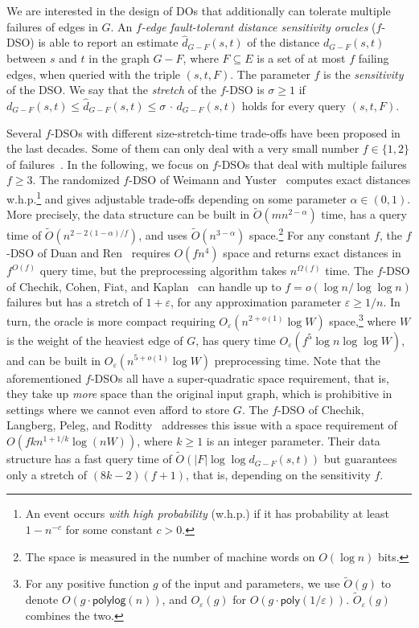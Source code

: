 \documentclass{theoretics}
\newcommand*{\Otilde}{\widetilde{O}}
\newcommand*{\poly}{\textsf{poly}}
\newcommand*{\polylog}{\textsf{polylog}}
\renewcommand{\leq}{\leqslant}
\renewcommand{\geq}{\geqslant}
\renewcommand{\ge}{\geqslant}
\newcommand{\eps}{\varepsilon}
\begin{document}
We are interested in the design of DOs that additionally can tolerate multiple failures of edges in $G$. 
An \emph{$f$-edge fault-tolerant distance sensitivity oracles} ($f$-DSO) is able to report an estimate $\widehat{d}_{G-F}(s,t)$ of the distance $d_{G-F}(s,t)$ between $s$ and $t$ in the graph $G-F$, where $F \subseteq E$ is a set of at most $f$ failing edges, when queried with the triple $(s,t,F)$. 
The parameter $f$ is the \emph{sensitivity} of the DSO.
We say that the \emph{stretch} of the $f$-DSO is $\sigma \geq 1$ if $d_{G-F}(s,t) \leq \widehat{d}_{G-F}(s,t) \leq \sigma \,{\cdot}\, d_{G-F}(s,t)$ holds for every query $(s,t,F)$. 

Several $f$-DSOs with different size-stretch-time trade-offs have been proposed in the last decades.
Some of them can only deal with a very small number $f \in \{1,2\}$ of failures~\cite{BaswanaK13, BeKa08, BeKa09, BCFS21SingleSourceDSO_ESA, ChCo20, DemetrescuT02, DeThChRa08, DuanP09a, GrandoniVWilliamsFasterRPandDSO_journal, GuRen21, Ren22Improved}. In the following, we focus on $f$-DSOs that deal with multiple failures $f \geq 3$. The randomized $f$-DSO of Weimann and Yuster~\cite{WY13} computes exact distances w.h.p.\footnote{%
  An event occurs \emph{with high probability} (w.h.p.) if it has probability at least $1- n^{-c}$ for some constant $c >0$.
}
and gives adjustable trade-offs depending on some parameter $\alpha \in (0,1)$.
More precisely, the data structure can be built in $\Otilde(mn^{2-\alpha})$ time, has a query time of 
$\Otilde(n^{2-2(1-\alpha)/f})$, and uses $\Otilde(n^{3-\alpha})$ space.\footnote{%
  The space is measured in the number of machine words on $O(\log n)$ bits.
} 
For any constant $f$, the $f$-DSO of Duan and Ren~\cite{DuRe22} requires $O(fn^4)$ space and
returns exact distances in $f^{O(f)}$ query time, but the preprocessing algorithm 
takes $n^{\Omega(f)}$ time. The $f$-DSO of Chechik, Cohen, Fiat, and Kaplan~\cite{ChCoFiKa17}
can handle up to $f = o(\log n / \log \log n)$ failures
but has a stretch of $1+\eps$, for any approximation parameter $\eps \ge 1/n$.
In turn, the oracle is more compact requiring $O_{\varepsilon}(n^{2+o(1)}\log W)$ space,\footnote{%
	For any positive function $g$ of the input and parameters, we use 
	$\Otilde(g)$ to denote $O(g \cdot \polylog(n))$,
	and $O_{\varepsilon}(g)$ for $O(g \cdot \poly(1/\varepsilon))$.
	$\Otilde_{\varepsilon}(g)$ combines the two.
}
where $W$ is the weight of the heaviest edge of $G$,
has query time $O_{\varepsilon}(f^5\log n \log \log W)$,
and can be built in $O_{\varepsilon}(n^{5+o(1)}\log W)$ preprocessing time.
Note that the aforementioned $f$-DSOs all have a super-quadratic space requirement,
that is, they take up \emph{more} space than the original input graph,
which is prohibitive in settings where we cannot even afford to store $G$.
The $f$-DSO of Chechik, Langberg, Peleg, and Roditty~\cite{CLPR12} addresses this issue
with a space requirement of $O(fkn^{1+1/k}\log(nW))$, 
where $k\geq 1$ is an integer parameter.
Their data structure has a fast query time of $\Otilde(|F| \log\log d_{G-F}(s,t))$
but guarantees only a stretch of $(8k-2)(f+1)$,
that is, depending on the sensitivity $f$.
\end{document}
